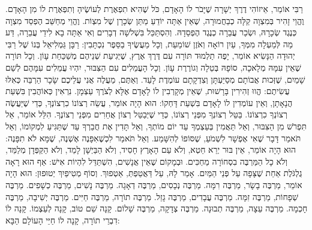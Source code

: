 רַבִּי אוֹמֵר, אֵיזוֹהִי דֶרֶךְ יְשָׁרָה שֶׁיָּבֹר לוֹ הָאָדָם, כֹּל שֶׁהִיא תִפְאֶרֶת לְעוֹשֶׂיהָ וְתִפְאֶרֶת לוֹ מִן הָאָדָם. וֶהֱוֵי זָהִיר בְּמִצְוָה קַלָּה כְבַחֲמוּרָה, שֶׁאֵין אַתָּה יוֹדֵעַ מַתַּן שְׂכָרָן שֶׁל מִצְוֹת. וֶהֱוֵי מְחַשֵּׁב הֶפְסֵד מִצְוָה כְּנֶגֶד שְׂכָרָהּ, וּשְׂכַר עֲבֵרָה כְנֶגֶד הֶפְסֵדָהּ. וְהִסְתַּכֵּל בִּשְׁלשָׁה דְבָרִים וְאִי אַתָּה בָא לִידֵי עֲבֵרָה, דַּע מַה לְּמַעְלָה מִמְּךָ, עַיִן רוֹאָה וְאֹזֶן שׁוֹמַעַת, וְכָל מַעֲשֶׂיךָ בַסֵּפֶר נִכְתָּבִין:
רַבָּן גַּמְלִיאֵל בְּנוֹ שֶׁל רַבִּי יְהוּדָה הַנָּשִׂיא אוֹמֵר, יָפֶה תַלְמוּד תּוֹרָה עִם דֶּרֶךְ אֶרֶץ, שֶׁיְּגִיעַת שְׁנֵיהֶם מְשַׁכַּחַת עָוֹן. וְכָל תּוֹרָה שֶׁאֵין עִמָּהּ מְלָאכָה, סוֹפָהּ בְּטֵלָה וְגוֹרֶרֶת עָוֹן. וְכָל הָעֲמֵלִים עִם הַצִּבּוּר, יִהְיוּ עֲמֵלִים עִמָּהֶם לְשֵׁם שָׁמַיִם, שֶׁזְּכוּת אֲבוֹתָם מְסַיַּעְתָּן וְצִדְקָתָם עוֹמֶדֶת לָעַד. וְאַתֶּם, מַעֲלֶה אֲנִי עֲלֵיכֶם שָׂכָר הַרְבֵּה כְּאִלּוּ עֲשִׂיתֶם:
הֱווּ זְהִירִין בָּרָשׁוּת, שֶׁאֵין מְקָרְבִין לוֹ לָאָדָם אֶלָּא לְצֹרֶךְ עַצְמָן. נִרְאִין כְּאוֹהֲבִין בִּשְׁעַת הֲנָאָתָן, וְאֵין עוֹמְדִין לוֹ לָאָדָם בִּשְׁעַת דָּחְקוֹ:
הוּא הָיָה אוֹמֵר, עֲשֵׂה רְצוֹנוֹ כִרְצוֹנְךָ, כְּדֵי שֶׁיַּעֲשֶׂה רְצוֹנְךָ כִרְצוֹנוֹ. בַּטֵּל רְצוֹנְךָ מִפְּנֵי רְצוֹנוֹ, כְּדֵי שֶׁיְּבַטֵּל רְצוֹן אֲחֵרִים מִפְּנֵי רְצוֹנֶךָ. הִלֵּל אוֹמֵר, אַל תִּפְרֹשׁ מִן הַצִּבּוּר, וְאַל תַּאֲמִין בְּעַצְמְךָ עַד יוֹם מוֹתְךָ, וְאַל תָּדִין אֶת חֲבֵרְךָ עַד שֶׁתַּגִּיעַ לִמְקוֹמוֹ, וְאַל תֹּאמַר דָּבָר שֶׁאִי אֶפְשָׁר לִשְׁמֹעַ, שֶׁסּוֹפוֹ לְהִשָּׁמַע. וְאַל תֹּאמַר לִכְשֶׁאִפָּנֶה אֶשְׁנֶה, שֶׁמָּא לֹא תִפָּנֶה:
הוּא הָיָה אוֹמֵר, אֵין בּוּר יְרֵא חֵטְא, וְלֹא עַם הָאָרֶץ חָסִיד, וְלֹא הַבַּיְשָׁן לָמֵד, וְלֹא הַקַּפְּדָן מְלַמֵּד, וְלֹא כָל הַמַּרְבֶּה בִסְחוֹרָה מַחְכִּים. וּבְמָקוֹם שֶׁאֵין אֲנָשִׁים, הִשְׁתַּדֵּל לִהְיוֹת אִישׁ:
אַף הוּא רָאָה גֻלְגֹּלֶת אַחַת שֶׁצָּפָה עַל פְּנֵי הַמַּיִם. אָמַר לָהּ, עַל דַּאֲטֵפְתְּ, אַטְפוּךְ. וְסוֹף מְטִיפַיִךְ יְטוּפוּן:
הוּא הָיָה אוֹמֵר, מַרְבֶּה בָשָׂר, מַרְבֶּה רִמָּה. מַרְבֶּה נְכָסִים, מַרְבֶּה דְאָגָה. מַרְבֶּה נָשִׁים, מַרְבֶּה כְשָׁפִים. מַרְבֶּה שְׁפָחוֹת, מַרְבֶּה זִמָּה. מַרְבֶּה עֲבָדִים, מַרְבֶּה גָזֵל. מַרְבֶּה תוֹרָה, מַרְבֶּה חַיִּים. מַרְבֶּה יְשִׁיבָה, מַרְבֶּה חָכְמָה. מַרְבֶּה עֵצָה, מַרְבֶּה תְבוּנָה. מַרְבֶּה צְדָקָה, מַרְבֶּה שָׁלוֹם. קָנָה שֵׁם טוֹב, קָנָה לְעַצְמוֹ. קָנָה לוֹ דִבְרֵי תוֹרָה, קָנָה לוֹ חַיֵּי הָעוֹלָם הַבָּא:
